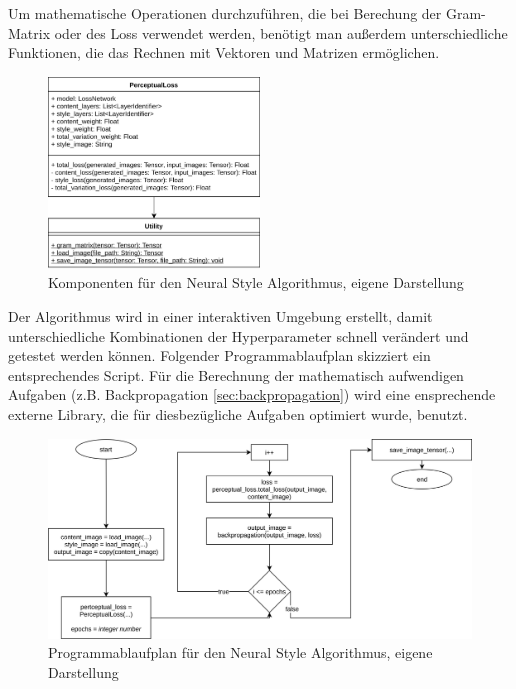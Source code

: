Um mathematische Operationen durchzuführen, die bei Berechung der Gram-Matrix oder des Loss verwendet werden, benötigt man außerdem unterschiedliche Funktionen, die das Rechnen mit Vektoren und Matrizen ermöglichen.


\begin{figure}[H]
	\centering
	\includegraphics[width=0.50\textwidth]{resources/content/neural_style_class_diagram.png}
	\caption{Komponenten für den Neural Style Algorithmus, eigene Darstellung}
	\label{img:neural_style_class_diagram_img}
\end{figure}

Der Algorithmus wird in einer interaktiven Umgebung erstellt, damit unterschiedliche Kombinationen der Hyperparameter schnell verändert und getestet werden können. Folgender Programmablaufplan skizziert ein entsprechendes Script. Für die Berechnung der mathematisch aufwendigen Aufgaben (z.B. Backpropagation \ref{sec:backpropagation}) wird eine ensprechende externe Library, die für diesbezügliche Aufgaben optimiert wurde, benutzt.

\begin{figure}[H]
	\centering
	\includegraphics[width=1.0\textwidth]{resources/content/neural_style_pap.png}
	\caption{Programmablaufplan für den Neural Style Algorithmus, eigene Darstellung}
	\label{img:neural_style_pap_img}
\end{figure}

